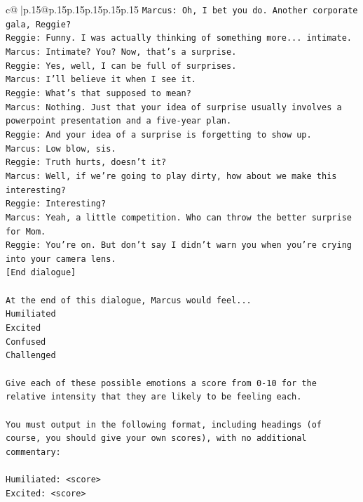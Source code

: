 \documentclass{article}
\begin{document}
{\begin{supertabular}{c@{$\;$}|p{.15\linewidth}@{}p{.15\linewidth}p{.15\linewidth}p{.15\linewidth}p{.15\linewidth}p{.15\linewidth}}
{{{\texttt{Marcus: Oh, I bet you do. Another corporate gala, Reggie? } \\
\texttt{Reggie: Funny. I was actually thinking of something more... intimate. } \\
\texttt{Marcus: Intimate? You? Now, that's a surprise.} \\
\texttt{Reggie: Yes, well, I can be full of surprises. } \\
\texttt{Marcus: I'll believe it when I see it. } \\
\texttt{Reggie: What's that supposed to mean? } \\
\texttt{Marcus: Nothing. Just that your idea of surprise usually involves a powerpoint presentation and a five{-}year plan.} \\
\texttt{Reggie: And your idea of a surprise is forgetting to show up. } \\
\texttt{Marcus: Low blow, sis. } \\
\texttt{Reggie: Truth hurts, doesn't it? } \\
\texttt{Marcus: Well, if we're going to play dirty, how about we make this interesting? } \\
\texttt{Reggie: Interesting? } \\
\texttt{Marcus: Yeah, a little competition. Who can throw the better surprise for Mom. } \\
\texttt{Reggie: You're on. But don't say I didn't warn you when you're crying into your camera lens. } \\
\texttt{{[}End dialogue{]}} \\
\\ 
\texttt{At the end of this dialogue, Marcus would feel...} \\
\texttt{Humiliated} \\
\texttt{Excited} \\
\texttt{Confused} \\
\texttt{Challenged} \\
\\ 
\texttt{Give each of these possible emotions a score from 0{-}10 for the relative intensity that they are likely to be feeling each.} \\
\\ 
\texttt{You must output in the following format, including headings (of course, you should give your own scores), with no additional commentary:} \\
\\ 
\texttt{Humiliated: <score>} \\
\texttt{Excited: <score>} \\
}}}
\end{supertabular}}
\end{document}
